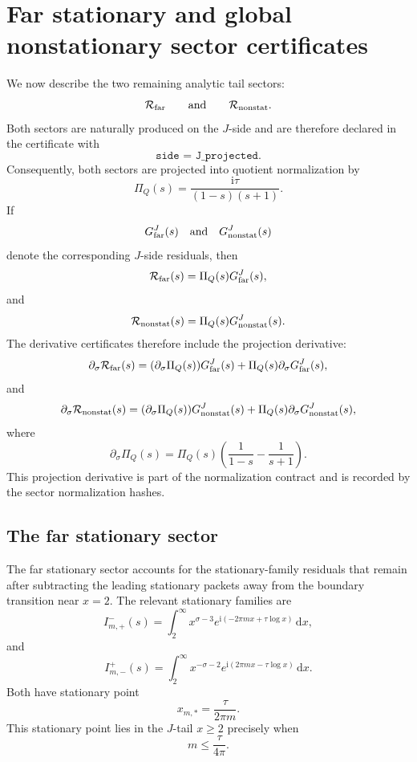 \documentclass[11pt]{article}
\newcommand{\ii}{\mathrm{i}}
\newcommand{\dd}{\mathrm{d}}
\newcommand{\s}{s}
\newcommand{\sig}{\sigma}
\newcommand{\tauh}{\tau}
\newcommand{\Rfar}{\mathcal R_{\rm far}}
\newcommand{\Rnonstat}{\mathcal R_{\rm nonstat}}
\newcommand{\PiQ}{\Pi_Q}
\newcommand{\JSON}[1]{\texttt{#1}}
\begin{document}

\section{Far stationary and global nonstationary sector certificates}

We now describe the two remaining analytic tail sectors:
\[
        \Rfar
        \qquad\text{and}\qquad
        \Rnonstat.
\]
Both sectors are naturally produced on the \(J\)-side and are therefore
declared in the certificate with
\[
        \JSON{side = J\_projected}.
\]
Consequently, both sectors are projected into quotient normalization by
\[
        \PiQ(\s)
        =
        \frac{\ii\tauh}{(1-\s)(\s+1)}.
\]
If
\[
        G_{\rm far}^{J}(\s)
        \quad\text{and}\quad
        G_{\rm nonstat}^{J}(\s)
\]
denote the corresponding \(J\)-side residuals, then
\[
        \Rfar(\s)=\PiQ(\s)G_{\rm far}^{J}(\s),
\]
and
\[
        \Rnonstat(\s)=\PiQ(\s)G_{\rm nonstat}^{J}(\s).
\]
The derivative certificates therefore include the projection derivative:
\[
        \partial_\sig\Rfar(\s)
        =
        (\partial_\sig\PiQ(\s))G_{\rm far}^{J}(\s)
        +
        \PiQ(\s)\partial_\sig G_{\rm far}^{J}(\s),
\]
and
\[
        \partial_\sig\Rnonstat(\s)
        =
        (\partial_\sig\PiQ(\s))G_{\rm nonstat}^{J}(\s)
        +
        \PiQ(\s)\partial_\sig G_{\rm nonstat}^{J}(\s),
\]
where
\[
        \partial_\sig\PiQ(\s)
        =
        \PiQ(\s)
        \left(
            \frac{1}{1-\s}
            -
            \frac{1}{\s+1}
        \right).
\]
This projection derivative is part of the normalization contract and is
recorded by the sector normalization hashes.

\subsection{The far stationary sector}

The far stationary sector accounts for the stationary-family residuals that
remain after subtracting the leading stationary packets away from the boundary
transition near \(x=2\).  The relevant stationary families are
\[
        I_{m,+}^{-}(\s)
        =
        \int_2^\infty
        x^{\sig-3}
        e^{\ii(-2\pi m x+\tauh\log x)}
        \,\dd x,
\]
and
\[
        I_{m,-}^{+}(\s)
        =
        \int_2^\infty
        x^{-\sig-2}
        e^{\ii(2\pi m x-\tauh\log x)}
        \,\dd x.
\]
Both have stationary point
\[
        x_{m,*}
        =
        \frac{\tauh}{2\pi m}.
\]
This stationary point lies in the \(J\)-tail \(x\ge2\) precisely when
\[
        m\le \frac{\tauh}{4\pi}.
\]
\end{document}
